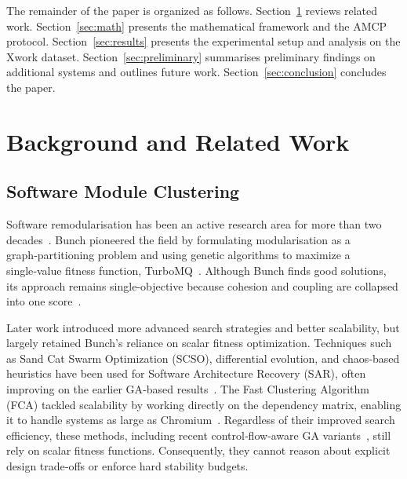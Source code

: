 \documentclass[conference]{IEEEtran}
\begin{document}
The remainder of the paper is organized as follows. Section~\ref{sec:background} reviews related work. Section~\ref{sec:math} presents the mathematical framework and the AMCP protocol. Section~\ref{sec:results} presents the experimental setup and analysis on the Xwork dataset. Section~\ref{sec:preliminary} summarises preliminary findings on additional systems and outlines future work. Section~\ref{sec:conclusion} concludes the paper.

\section{Background and Related Work}
\label{sec:background}

\subsection{Software Module Clustering}
Software remodularisation has been an active research area for more than two decades~\cite{Mancoridis1998,Mitchell2006}. Bunch pioneered the field by formulating modularisation as a graph‑partitioning problem and using genetic algorithms to maximize a single‑value fitness function, TurboMQ~\cite{Mitchell2006,Shokoufandeh2005}. Although Bunch finds good solutions, its approach remains single‑objective because cohesion and coupling are collapsed into one score~\cite{Mitchell2007,Pourasghar2024}.

Later work introduced more advanced search strategies and better scalability, but largely retained Bunch’s reliance on scalar fitness optimization. Techniques such as Sand Cat Swarm Optimization (SCSO), differential evolution, and chaos‑based heuristics have been used for Software Architecture Recovery (SAR), often improving on the earlier GA‑based results~\cite{Arasteh2023,Gupta2023,Kiani2023}. The Fast Clustering Algorithm (FCA) tackled scalability by working directly on the dependency matrix, enabling it to handle systems as large as Chromium~\cite{Teymourian2022}. Regardless of their improved search efficiency, these methods, including recent control‑flow‑aware GA variants~\cite{Pourasghar2024}, still rely on scalar fitness functions. Consequently, they cannot reason about explicit design trade‑offs or enforce hard stability budgets.
\end{document}
